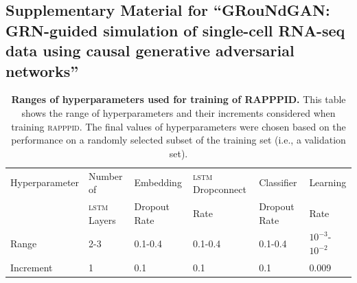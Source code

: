 \begin{singlespace}
\chapter[Supplementary Material for ``GRouNdGAN: GRN-guided simulation of single-cell RNA-seq data using causal generative adversarial networks'']{Supplementary Material for ``GRouNdGAN: GRN-guided simulation of single-cell RNA-seq data using causal generative adversarial networks''}
%
\end{singlespace}

\setcounter{table}{0}
\renewcommand{\thetable}{S\arabic{table}}
\renewcommand{\thefigure}{S\arabic{figure}}

\begin{table}[h]
	\caption[Ranges of hyperparameters used for training of \textsc{rapppid}.]{\textbf{\textsf{Ranges of hyperparameters used for training of RAPPPID.}} This table shows the range of hyperparameters and their increments considered when training \textsc{rapppid}. The final values of hyperparameters were chosen based on the performance on a randomly selected subset of the training set (i.e., a validation set). \label{tab:rapppid_hyperparam_range}} {\begin{tabular}{@{}llllll@{}}\toprule 
			Hyperparameter & Number of & Embedding & \textsc{lstm} Dropconnect & Classifier & Learning\\
            & \textsc{lstm} Layers & Dropout Rate & Rate & Dropout Rate & Rate\\\midrule
			Range & 2-3 & 0.1-0.4 & 0.1-0.4 & 0.1-0.4 & $10^{-3}$-$10^{-2}$\\
            Increment & 1 & 0.1 & 0.1 & 0.1 & 0.009\\
			\midrule
	\end{tabular}}{}
\end{table}

